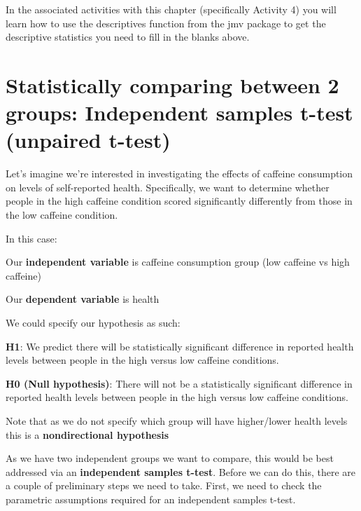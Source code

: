 \documentclass[
]{book}
\begin{document}
In the associated activities with this chapter (specifically Activity 4) you will learn how to use the descriptives function from the jmv package to get the descriptive statistics you need to fill in the blanks above.

\section{Statistically comparing between 2 groups: Independent samples t-test (unpaired t-test)}\label{statistically-comparing-between-2-groups-independent-samples-t-test-unpaired-t-test}

Let's imagine we're interested in investigating the effects of caffeine consumption on levels of self-reported health. Specifically, we want to determine whether people in the high caffeine condition scored significantly differently from those in the low caffeine condition.

In this case:

Our \textbf{independent variable} is caffeine consumption group (low caffeine vs high caffeine)

Our \textbf{dependent variable} is health

We could specify our hypothesis as such:

\textbf{H1}: We predict there will be statistically significant difference in reported health levels between people in the high versus low caffeine conditions.

\textbf{H0 (Null hypothesis)}: There will not be a statistically significant difference in reported health levels between people in the high versus low caffeine conditions.

Note that as we do not specify which group will have higher/lower health levels this is a \textbf{nondirectional hypothesis}

As we have two independent groups we want to compare, this would be best addressed via an \textbf{independent samples t-test}. Before we can do this, there are a couple of preliminary steps we need to take. First, we need to check the parametric assumptions required for an independent samples t-test.
\end{document}
